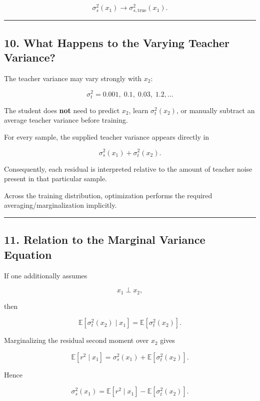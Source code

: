 \[
\boxed{
\sigma_s^2(x_1)\rightarrow\sigma_{s,\mathrm{true}}^2(x_1).
}
\]

\begin{center}\rule{0.5\linewidth}{0.5pt}\end{center}

\subsection{10. What Happens to the Varying Teacher
Variance?}\label{what-happens-to-the-varying-teacher-variance}

The teacher variance may vary strongly with \(x_2\):

\[
\sigma_t^2=0.001,\;0.1,\;0.03,\;1.2,\ldots
\]

The student does \textbf{not} need to predict \(x_2\), learn
\(\sigma_t^2(x_2)\), or manually subtract an average teacher variance
before training.

For every sample, the supplied teacher variance appears directly in

\[
\sigma_s^2(x_1)+\sigma_t^2(x_2).
\]

Consequently, each residual is interpreted relative to the amount of
teacher noise present in that particular sample.

Across the training distribution, optimization performs the required
averaging/marginalization implicitly.

\begin{center}\rule{0.5\linewidth}{0.5pt}\end{center}

\subsection{11. Relation to the Marginal Variance
Equation}\label{relation-to-the-marginal-variance-equation}

If one additionally assumes

\[
x_1\perp x_2,
\]

then

\[
\mathbb{E}[\sigma_t^2(x_2)\mid x_1]
=
\mathbb{E}[\sigma_t^2(x_2)].
\]

Marginalizing the residual second moment over \(x_2\) gives

\[
\mathbb{E}[r^2\mid x_1]
=
\sigma_s^2(x_1)
+
\mathbb{E}[\sigma_t^2(x_2)].
\]

Hence

\[
\boxed{
\sigma_s^2(x_1)
=
\mathbb{E}[r^2\mid x_1]
-
\mathbb{E}[\sigma_t^2(x_2)].
}
\]

